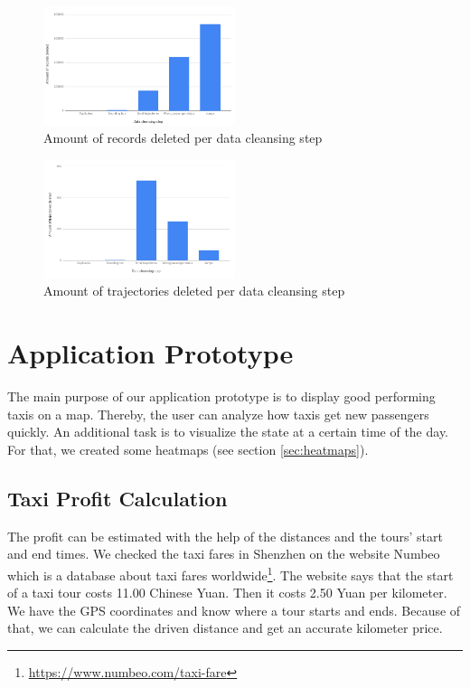 \documentclass[10pt]{sig-alternate}
\begin{document}
\begin{figure}[ht]
\centering
\includegraphics[width=0.5\textwidth]{img/records_deleted.png}
\caption{Amount of records deleted per data cleansing step}
\label{fig:records_deleted}
\end{figure}


\begin{figure}[ht]
\centering
\includegraphics[width=0.5\textwidth]{img/trajectories_deleted.png}
\caption{Amount of trajectories deleted per data cleansing step}
\label{fig:trajectories_deleted}
\end{figure}

\section{Application Prototype}

The main purpose of our application prototype is to display good performing taxis on a map. Thereby, the user can analyze how taxis get new passengers quickly. An additional task is to visualize the state at a certain time of the day. For that, we created some heatmaps (see section \ref{sec:heatmaps}).

\subsection{Taxi Profit Calculation}

The profit can be estimated with the help of the distances and the tours' start and end times. We checked the taxi fares in Shenzhen on the website Numbeo which is a database about taxi fares worldwide\footnote{\href{https://www.numbeo.com/taxi-fare/country_result.jsp?country=China}{https://www.numbeo.com/taxi-fare}}. The website says that the start of a taxi tour costs 11.00 Chinese Yuan. Then it costs 2.50 Yuan per kilometer. We have the GPS coordinates and know where a tour starts and ends. Because of that, we can calculate the driven distance and get an accurate kilometer price.
\end{document}
